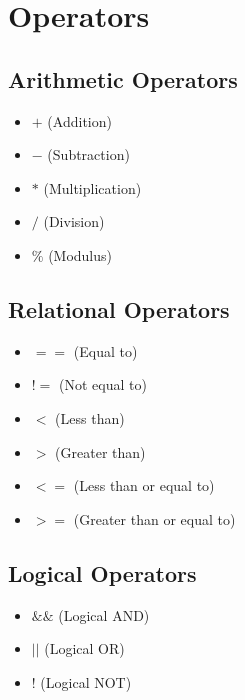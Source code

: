 \documentclass{report}
\begin{document}
    \pagebreak \bigbreak \noindent 
    \section{\LARGE Operators}
    \bigbreak \noindent 
    \begin{minipage}[t]{0.47\textwidth}
        \subsection{Arithmetic Operators}
        \begin{itemize}
          \item \( + \) (Addition)
          \item \( - \) (Subtraction)
          \item \( * \) (Multiplication)
          \item \( / \) (Division)
          \item \( \% \) (Modulus)
        \end{itemize}
    \end{minipage}
    \begin{minipage}[t]{0.47\textwidth}
     \subsection{Relational Operators}
    \begin{itemize}
      \item \( == \) (Equal to)
      \item \( != \) (Not equal to)
      \item \( < \) (Less than)
      \item \( > \) (Greater than)
      \item \( <= \) (Less than or equal to)
      \item \( >= \) (Greater than or equal to)
    \end{itemize}
    \end{minipage}
    \bigbreak \noindent 
    \begin{minipage}[t]{0.47\textwidth}
    \subsection{Logical Operators}
    \begin{itemize}
      \item \( \&\& \) (Logical AND)
      \item \( || \) (Logical OR)
      \item \( ! \) (Logical NOT)
    \end{itemize}
    \end{minipage}
\end{document}

